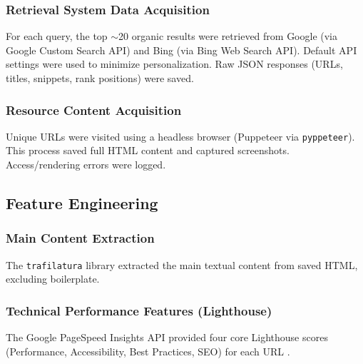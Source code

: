 \documentclass[a4paper,fleqn]{cas-sc}
\begin{document}
\subsubsection{Retrieval System Data Acquisition}
\label{subsubsec:serp_acq}
For each query, the top $\sim$20 organic results were retrieved from Google (via Google Custom Search API) and Bing (via Bing Web Search API). Default API settings were used to minimize personalization. Raw JSON responses (URLs, titles, snippets, rank positions) were saved.

\subsubsection{Resource Content Acquisition}
\label{subsubsec:content_acq}
Unique URLs were visited using a headless browser (Puppeteer via \texttt{pyppeteer}). This process saved full HTML content and captured screenshots. Access/rendering errors were logged.

\subsection{Feature Engineering}
\label{subsec:features}
\subsubsection{Main Content Extraction}
\label{subsubsec:trafilatura}
The \texttt{trafilatura} library \citep{Barbaresi2021} extracted the main textual content from saved HTML, excluding boilerplate.

\subsubsection{Technical Performance Features (Lighthouse)}
\label{subsubsec:lighthouse}
The Google PageSpeed Insights API provided four core Lighthouse scores (Performance, Accessibility, Best Practices, SEO) for each URL \citep{Roumeliotis2022}.
\end{document}

